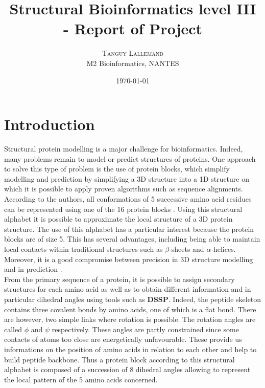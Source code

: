 \documentclass[11pt,a4paper]{article}
\title{Structural Bioinformatics level III - Report of Project}
\author{
    \textsc{Tanguy Lallemand} \\[1ex] 
    \normalsize M2 Bioinformatics, NANTES \\ 
}
\date{\today}
\begin{document}
    \maketitle
    \section{Introduction}
    
    
    
    
    Structural protein modelling is a major challenge for bioinformatics. Indeed, many problems remain to model or predict structures of proteins. One approach to solve this type of problem is the use of protein blocks, which simplify modelling and prediction by simplifying a 3D structure into a 1D structure on which it is possible to apply proven algorithms such as sequence alignments. According to the authors, all conformations of 5 successive amino acid residues can be represented using one of the 16 protein blocks \cite{brevern_etchebest_hazout_2000}. Using this structural alphabet it is possible to approximate the local structure of a 3D protein structure. The use of this alphabet has a particular interest because the protein blocks are of size 5. This has several advantages, including being able to maintain local contacts within traditional structures such as $\beta$-sheets and $\alpha$-helices. Moreover, it is a good compromise between precision in 3D structure modelling and in prediction \cite{brevern_etchebest_hazout_2000}.\\
    From the primary sequence of a protein, it is possible to assign secondary structures for each amino acid as well as to obtain different information and in particular dihedral angles using tools such as \textbf{DSSP}. Indeed, the peptide skeleton contains three covalent bonds by amino acids, one of which is a flat bond. There are however, two simple links where rotation is possible. The rotation angles are called $\phi$ and $\psi$ respectively. These angles are partly constrained since some contacts of atoms too close are energetically unfavourable. These provide us informations on the position of amino acids in relation to each other and help to build peptide backbone. Thus a protein block according to this structural alphabet \cite{brevern_etchebest_hazout_2000} is composed of a succession of 8 dihedral angles allowing to represent the local pattern of the 5 amino acids concerned. 
\end{document}
